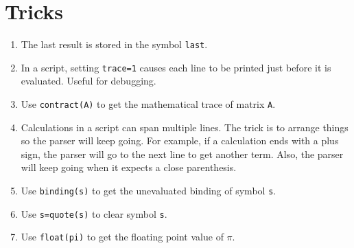 \section{Tricks}
\begin{enumerate}

\item
The last result is stored in the symbol \verb$last$.

\item
In a script, setting \verb$trace=1$
causes each line to be printed just before it is evaluated.
Useful for debugging.

\item
Use \verb$contract(A)$ to get the mathematical trace of matrix \verb$A$.

\item
Calculations in a script can span multiple lines.
The trick is to arrange things so the parser will keep going.
For example, if a calculation ends with a plus sign, the parser will go to the next line to get another term.
Also, the parser will keep going when it expects a close parenthesis.

\item
Use \verb$binding(s)$ to get the unevaluated binding of symbol \verb$s$.

\item
Use \verb$s=quote(s)$ to clear symbol \verb$s$.

\item
Use \verb$float(pi)$ to get the floating point value of $\pi$.

\end{enumerate}

